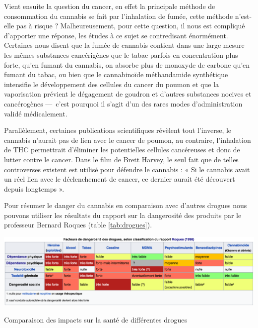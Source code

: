 Vient ensuite la question du cancer, en effet la principale méthode de consommation du cannabis se fait par l’inhalation de fumée, cette méthode n’est-elle pas à risque ? Malheureusement, pour cette question, il nous est compliqué d’apporter une réponse, les études à ce sujet se contredisant énormément. Certaines nous disent que la fumée de cannabis contient dans une large mesure les mêmes substances cancérigènes que le tabac parfois en concentration plus forte, qu’en fumant du cannabis, on absorbe plus de monoxyde de carbone qu’en fumant du tabac, ou bien que le cannabinoïde méthandamide synthétique intensifie le développement des cellules du cancer du poumon et que la vaporisation prévient le dégagement de goudron et d’autres substances nocives et cancérogènes ---~c’est pourquoi il s’agit d’un des rares modes d’administration validé médicalement.\cite{cannacancer} 

Parallèlement, certaines publications scientifiques révèlent tout l’inverse, le cannabis n’aurait pas de lien avec le cancer de poumon, au contraire, l’inhalation de THC permettrait d’éliminer les potentielles cellules cancéreuses et donc de lutter contre le cancer. \cite{washington} Dans le film de Brett Harvey, le seul fait que de telles controverses existent est utilisé pour défendre le cannabis : « Si le cannabis avait un réel lien avec le déclenchement de cancer, ce dernier aurait été découvert depuis longtemps ».

Pour résumer le danger du cannabis en comparaison avec d’autres drogues nous pouvons utiliser les résultats du rapport sur la dangerosité des produits par le professeur Bernard Roques (table \ref{tab:drogues}).

\begin{table}\centering
	\includegraphics[width=\textwidth]{images/dependance.png}
    \caption{Comparaison des impacts sur la santé de différentes drogues}
    \label{tab:drogues}
\end{table}

